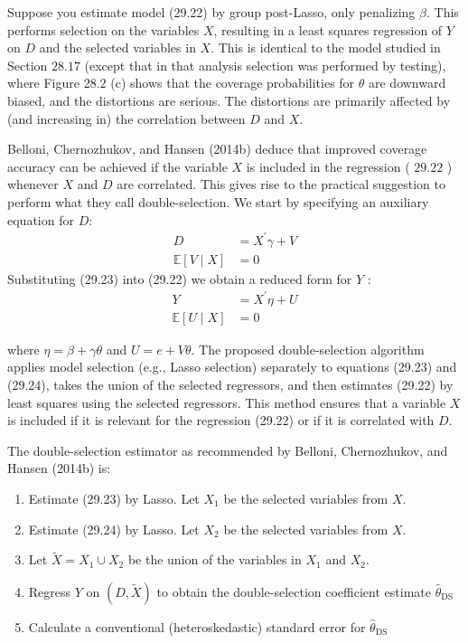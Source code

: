 Suppose you estimate model (29.22) by group post-Lasso, only penalizing $\beta$. This performs selection on the variables $X$, resulting in a least squares regression of $Y$ on $D$ and the selected variables in $X$. This is identical to the model studied in Section $28.17$ (except that in that analysis selection was performed by testing), where Figure $28.2$ (c) shows that the coverage probabilities for $\theta$ are downward biased, and the distortions are serious. The distortions are primarily affected by (and increasing in) the correlation between $D$ and $X$.

Belloni, Chernozhukov, and Hansen (2014b) deduce that improved coverage accuracy can be achieved if the variable $X$ is included in the regression ( $29.22$ ) whenever $X$ and $D$ are correlated. This gives rise to the practical suggestion to perform what they call double-selection. We start by specifying an auxiliary equation for $D:$
$$
\begin{aligned}
D &=X^{\prime} \gamma+V \\
\mathbb{E}[V \mid X] &=0
\end{aligned}
$$
Substituting (29.23) into (29.22) we obtain a reduced form for $Y$ :
$$
\begin{aligned}
Y &=X^{\prime} \eta+U \\
\mathbb{E}[U \mid X] &=0
\end{aligned}
$$

where $\eta=\beta+\gamma \theta$ and $U=e+V \theta$. The proposed double-selection algorithm applies model selection (e.g., Lasso selection) separately to equations (29.23) and (29.24), takes the union of the selected regressors, and then estimates (29.22) by least squares using the selected regressors. This method ensures that a variable $X$ is included if it is relevant for the regression (29.22) or if it is correlated with $D$.

The double-selection estimator as recommended by Belloni, Chernozhukov, and Hansen (2014b) is:

\begin{enumerate}
\item Estimate (29.23) by Lasso. Let $X_{1}$ be the selected variables from $X$.
\item Estimate (29.24) by Lasso. Let $X_{2}$ be the selected variables from $X$.
\item Let $\tilde{X}=X_{1} \cup X_{2}$ be the union of the variables in $X_{1}$ and $X_{2}$.
\item Regress $Y$ on $(D, \widetilde{X})$ to obtain the double-selection coefficient estimate $\widehat{\theta}_{\mathrm{DS}}$
\item Calculate a conventional (heteroskedastic) standard error for $\widehat{\theta}_{\mathrm{DS}}$
\end{enumerate}

